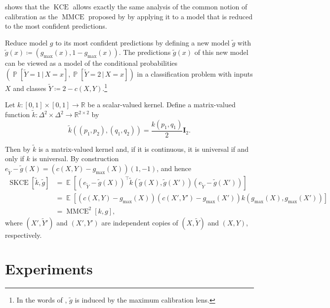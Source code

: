 \documentclass{article}
\DeclareMathOperator{\Prob}{\mathbb{P}}
\DeclareMathOperator{\Expect}{\mathbb{E}}
\DeclareMathOperator{\kernelmeasure}{KCE}
\DeclareMathOperator{\squaredkernelmeasure}{SKCE}
\DeclareMathOperator{\MMCE}{MMCE}
\newcommand{\given}{\,|\,}
\begin{document}
 shows that the $\kernelmeasure$ allows exactly the
same analysis of the common notion of calibration as the $\MMCE$ proposed by
\citet{kumar18_train_calib_measur_neural_networ} by applying it to a model that
is reduced to the most confident predictions.

\begin{example}\label{ex:mmce_kumar_special}
  Reduce model $g$ to its most confident predictions by defining a new model
  $\tilde{g}$ with $\tilde{g}(x) \coloneqq (g_{\max}(x), 1 - g_{\max}(x))$. The
  predictions $\tilde{g}(x)$ of this new model can be viewed as a model of the
  conditional probabilities
  $(\Prob[\tilde{Y} = 1 \given X = x], \Prob[\tilde{Y} = 2 \given X = x])$ in a
  classification problem with inputs $X$ and classes
  $\tilde{Y} \coloneqq 2 - c(X, Y)$.\footnote{In the
    words of \citet{vaicenavicius19_evaluat}, $\tilde{g}$ is induced by the
    maximum calibration lens.}

  Let $k \colon [0,1] \times [0,1] \to \mathbb{R}$ be a scalar-valued kernel.
  Define a matrix-valued function
  $\tilde{k} \colon \Delta^2 \times \Delta^2 \to \mathbb{R}^{2 \times 2}$ by
  \begin{equation*}
    \tilde{k}((p_1, p_2), (q_1, q_2)) = \frac{k(p_1, q_1)}{2} \mathbf{I}_2.
  \end{equation*}

  Then by \citet[Example~1 and Theorem~14]{caponnetto08_univer_multi_task_kernel}
  $\tilde{k}$ is a matrix-valued kernel and, if it is continuous, it is universal
  if and only if $k$ is universal. By construction
  $e_{\tilde{Y}} - \tilde{g}(X) = (c(X, Y) - g_{\max}(X)) (1, -1)$, and hence
  \begin{equation*}
    \begin{split}
      \squaredkernelmeasure[\tilde{k}, \tilde{g}] &= \Expect[{(e_{\tilde{Y}} - \tilde{g}(X))}^\intercal \tilde{k}(\tilde{g}(X), \tilde{g}(X')) (e_{\tilde{Y}} - \tilde{g}(X'))] \\
      &= \Expect[(c(X, Y) - g_{\max}(X)) (c(X', Y') - g_{\max}(X')) k(g_{\max}(X), g_{\max}(X'))] \\
      &= \MMCE^2[k, g],
    \end{split}
  \end{equation*}
  where $(X', \tilde{Y}')$ and $(X', Y')$ are independent copies of
  $(X, \tilde{Y})$ and $(X, Y)$, respectively.
\end{example}

\clearpage
\section{Experiments}\label{sec:experiment_app}
\end{document}
